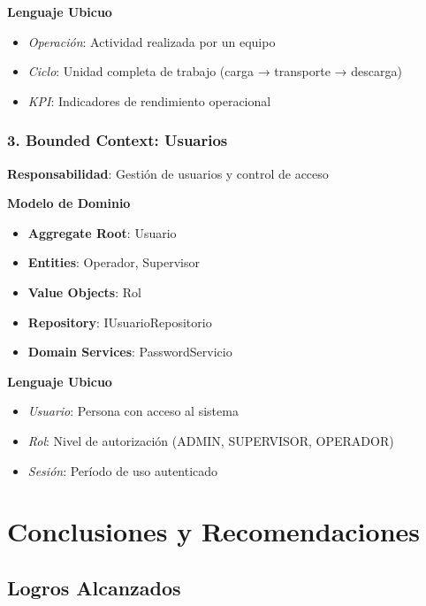 \documentclass[12pt,a4paper]{article}
\begin{document}
\textbf{Lenguaje Ubicuo}
\begin{itemize}
    \item \textit{Operación}: Actividad realizada por un equipo
    \item \textit{Ciclo}: Unidad completa de trabajo (carga → transporte → descarga)
    \item \textit{KPI}: Indicadores de rendimiento operacional
\end{itemize}

\subsubsection{3. Bounded Context: Usuarios}

\textbf{Responsabilidad}: Gestión de usuarios y control de acceso

\textbf{Modelo de Dominio}
\begin{itemize}
    \item \textbf{Aggregate Root}: Usuario
    \item \textbf{Entities}: Operador, Supervisor
    \item \textbf{Value Objects}: Rol
    \item \textbf{Repository}: IUsuarioRepositorio
    \item \textbf{Domain Services}: PasswordServicio
\end{itemize}

\textbf{Lenguaje Ubicuo}
\begin{itemize}
    \item \textit{Usuario}: Persona con acceso al sistema
    \item \textit{Rol}: Nivel de autorización (ADMIN, SUPERVISOR, OPERADOR)
    \item \textit{Sesión}: Período de uso autenticado
\end{itemize}

\newpage

\section{Conclusiones y Recomendaciones}

\subsection{Logros Alcanzados}
\end{document}
